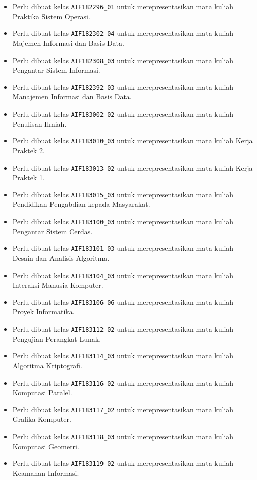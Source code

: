 \begin{enumerate}
\begin{itemize}
		\item Perlu dibuat kelas \texttt{AIF182296\_01} untuk merepresentasikan mata kuliah Praktika Sistem Operasi.
		\item Perlu dibuat kelas \texttt{AIF182302\_04} untuk merepresentasikan mata kuliah Majemen Informasi dan Basis Data.
		\item Perlu dibuat kelas \texttt{AIF182308\_03} untuk merepresentasikan mata kuliah Pengantar Sistem Informasi.
		\item Perlu dibuat kelas \texttt{AIF182392\_03} untuk merepresentasikan mata kuliah Manajemen Informasi dan Basis Data.
		\item Perlu dibuat kelas \texttt{AIF183002\_02} untuk merepresentasikan mata kuliah Penulisan Ilmiah.
		\item Perlu dibuat kelas \texttt{AIF183010\_03} untuk merepresentasikan mata kuliah Kerja Praktek 2.
		\item Perlu dibuat kelas \texttt{AIF183013\_02} untuk merepresentasikan mata kuliah Kerja Praktek 1.
		\item Perlu dibuat kelas \texttt{AIF183015\_03} untuk merepresentasikan mata kuliah Pendidikan Pengabdian kepada Masyarakat.
		\item Perlu dibuat kelas \texttt{AIF183100\_03} untuk merepresentasikan mata kuliah Pengantar Sistem Cerdas.
		\item Perlu dibuat kelas \texttt{AIF183101\_03} untuk merepresentasikan mata kuliah Desain dan Analisis Algoritma.
		\item Perlu dibuat kelas \texttt{AIF183104\_03} untuk merepresentasikan mata kuliah Interaksi Manusia Komputer.
		\item Perlu dibuat kelas \texttt{AIF183106\_06} untuk merepresentasikan mata kuliah Proyek Informatika.
		\item Perlu dibuat kelas \texttt{AIF183112\_02} untuk merepresentasikan mata kuliah Pengujian Perangkat Lunak.
		\item Perlu dibuat kelas \texttt{AIF183114\_03} untuk merepresentasikan mata kuliah Algoritma Kriptografi.
		\item Perlu dibuat kelas \texttt{AIF183116\_02} untuk merepresentasikan mata kuliah Komputasi Paralel.
		\item Perlu dibuat kelas \texttt{AIF183117\_02} untuk merepresentasikan mata kuliah Grafika Komputer.
		\item Perlu dibuat kelas \texttt{AIF183118\_03} untuk merepresentasikan mata kuliah Komputasi Geometri.
		\item Perlu dibuat kelas \texttt{AIF183119\_02} untuk merepresentasikan mata kuliah Keamanan Informasi.

\end{itemize}
\end{enumerate}
